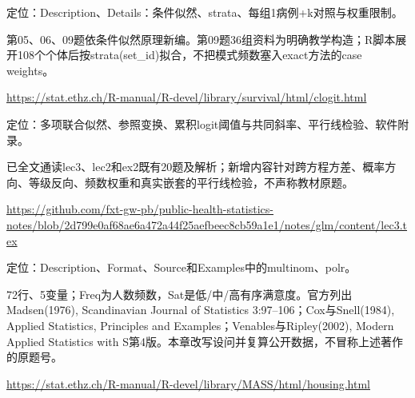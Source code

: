 \par\noindent\begin{minipage}{\linewidth}\raggedright{}\label{src:G2-CLOGIT}
\par
定位：Description、Details：条件似然、strata、每组1病例+k对照与权重限制。\par
第05、06、09题依条件似然原理新编。第09题36组资料为明确教学构造；R脚本展开108个个体后按strata(set\_id)拟合，不把模式频数塞入exact方法的case weights。\par
{\small \url{https://stat.ethz.ch/R-manual/R-devel/library/survival/html/clogit.html}}\par
\end{minipage}\par\medskip

\par\noindent\begin{minipage}{\linewidth}\raggedright{}\label{src:G3-NOTE}
\par
定位：多项联合似然、参照变换、累积logit阈值与共同斜率、平行线检验、软件附录。\par
已全文通读lec3、lec2和ex2既有20题及解析；新增内容针对跨方程方差、概率方向、等级反向、频数权重和真实嵌套的平行线检验，不声称教材原题。\par
{\small \url{https://github.com/fxt-gw-pb/public-health-statistics-notes/blob/2d799e0af68ae6a472a44f25aefbeec8cb59a1e1/notes/glm/content/lec3.tex}}\par
\end{minipage}\par\medskip

\par\noindent\begin{minipage}{\linewidth}\raggedright{}\label{src:G3-HOUSING}
\par
定位：Description、Format、Source和Examples中的multinom、polr。\par
72行、5变量；Freq为人数频数，Sat是低/中/高有序满意度。官方列出Madsen(1976), Scandinavian Journal of Statistics 3:97–106；Cox与Snell(1984), Applied Statistics, Principles and Examples；Venables与Ripley(2002), Modern Applied Statistics with S第4版。本章改写设问并复算公开数据，不冒称上述著作的原题号。\par
{\small \url{https://stat.ethz.ch/R-manual/R-devel/library/MASS/html/housing.html}}\par
\end{minipage}\par\medskip

